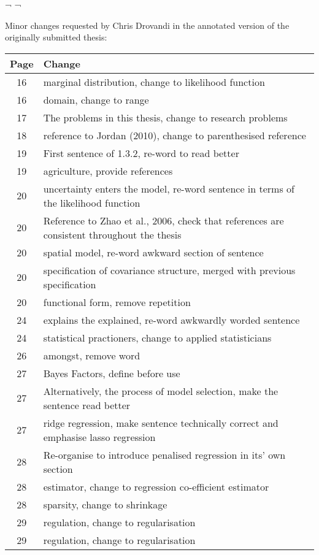 \documentclass{amsart}
\begin{document}
¬
¬

Minor changes requested by Chris Drovandi in the annotated version of the
originally submitted thesis:

\begin{tabular}{cl}
Page & Change \\
\hline
 16  &  marginal distribution, change to likelihood function\\
 16  &  domain, change to range\\
 17  &  The problems in this thesis, change to research problems\\
 18  &  reference to Jordan (2010), change to parenthesised reference\\
 19  &  First sentence of 1.3.2, re-word to read better\\
 19  &  agriculture, provide references\\
 20  &  uncertainty enters the model, re-word sentence in terms of the
			likelihood function\\
 20  &  Reference to Zhao et al., 2006, check that references are consistent
			throughout the thesis\\
 20  &  spatial model, re-word awkward section of sentence\\
 20  &  specification of covariance structure, merged with previous
			specification\\
 20  &  functional form, remove repetition\\
 24  &  explains the explained, re-word awkwardly worded sentence\\
 24  &  statistical practioners, change to applied statisticians\\
 26  &  amongst, remove word\\
 27  &  Bayes Factors, define before use\\
 27  &  Alternatively, the process of model selection, make the sentence
			read better\\
 27  &  ridge regression, make sentence technically correct and emphasise
lasso regression\\
 28  &  Re-organise to introduce penalised regression in its' own section\\
 28  &  estimator, change to regression co-efficient estimator\\
 28  &  sparsity, change to shrinkage\\
 29  &  regulation, change to regularisation\\
 29  &  regulation, change to regularisation\\

\end{tabular}
\end{document}

